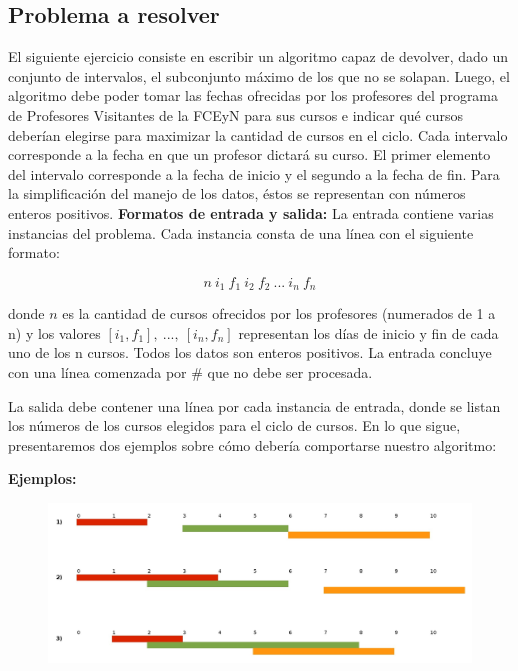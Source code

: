 \subsection{Problema a resolver}
El siguiente ejercicio consiste en escribir un algoritmo capaz de devolver, dado un conjunto de intervalos, el subconjunto máximo de los que no se solapan. Luego, el algoritmo debe poder tomar las fechas ofrecidas por los profesores del programa de Profesores Visitantes de la FCEyN para sus cursos e indicar qué cursos deberían elegirse para maximizar la cantidad de cursos en el ciclo. Cada intervalo corresponde a la fecha en que un profesor  dictará su curso. El primer elemento del intervalo corresponde a la fecha de inicio y el segundo a la fecha de fin. Para la simplificación del manejo de los datos, éstos se representan con números enteros positivos.\newline
\newline
\textbf {Formatos de entrada y salida:}\newline
\newline
La entrada contiene varias instancias del problema. Cada instancia consta de una línea con el siguiente formato:

$$n\ i_{1}\ f_{1}\ i_{2}\ f_{2}\ ...\ i_{n}\ f_{n}$$


donde \textbf{$n$} es la cantidad de cursos ofrecidos por los profesores (numerados de 1 a n) y los valores \textbf{$[i_{1},f_{1}],\ ...,\ [i_{n},f_{n}]$} representan los días de inicio y fin de cada uno de los n cursos. Todos los datos son enteros positivos. La entrada concluye con una línea comenzada por \# que no debe ser procesada.\newline

La salida debe contener una línea por cada instancia de entrada, donde se listan los números de los cursos elegidos para el ciclo de cursos.\newline
\newline
En lo que sigue, presentaremos dos ejemplos sobre cómo debería comportarse nuestro algoritmo:

{\large{\textbf{Ejemplos:}}}\newline

\begin{figure}[H] %
\begin{center}
\includegraphics[width=450pt]{../imgs/ejemplosej2.jpg}
\end{center}
\end{figure}

